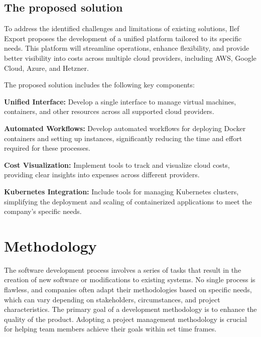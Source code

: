 \subsection{The proposed solution}
To address the identified challenges and limitations of existing solutions, Ilef Export proposes the development of a unified platform tailored to its specific needs. This platform will streamline operations, enhance flexibility, and provide better visibility into costs across multiple cloud providers, including AWS, Google Cloud, Azure, and Hetzner.

The proposed solution includes the following key components:
\begin{positemize}
  \item \textbf{ Unified Interface:}
  Develop a single interface to manage virtual machines, containers, and other resources across all supported cloud providers.

  \item \textbf{ Automated Workflows:}
  Develop automated workflows for deploying Docker containers and setting up instances, significantly reducing the time and effort required for these processes.

  \item \textbf{ Cost Visualization: }
  Implement tools to track and visualize cloud costs, providing clear insights into expenses across different providers.

  \item \textbf{ Kubernetes Integration:}
  Include tools for managing Kubernetes clusters, simplifying the deployment and scaling of containerized applications to meet the company's specific needs.
\end{positemize}



\section{Methodology}
The software development process involves a series of tasks that result in the creation of new software or modifications to existing systems. No single process is flawless, and companies often adapt their methodologies based on specific needs, which can vary depending on stakeholders, circumstances, and project characteristics. The primary goal of a development methodology is to enhance the quality of the product. Adopting a project management methodology is crucial for helping team members achieve their goals within set time frames. 
